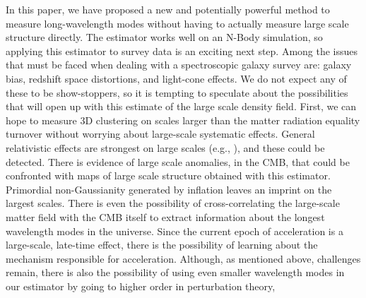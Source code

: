 \documentclass[prd,amsmath,amssymb,floatfix,superscriptaddress,nofootinbib,twocolumn]{revtex4-1}
\begin{document}
\label{sec4}
In this paper, we have proposed a new and potentially powerful method to measure long-wavelength modes without having to actually measure large scale structure directly. The estimator works well on an N-Body simulation, so applying this estimator to survey data is an exciting next step. Among the issues that must be faced when dealing with a spectroscopic galaxy survey are: galaxy bias, redshift space distortions, and light-cone effects. We do not expect any of these to be show-stoppers, so it is tempting to speculate about the possibilities that will open up with this estimate of the large scale density field. 
First, we can hope to measure 3D clustering on scales larger than the matter radiation equality turnover without worrying about large-scale systematic effects. General relativistic effects are strongest on large scales (e.g., \cite{Jeong:2012ls}), and these could be detected. There is evidence of large scale anomalies, in the CMB, that could be confronted with maps of large scale structure obtained with this estimator. Primordial non-Gaussianity generated by inflation leaves an imprint on the largest scales. There is even the possibility of cross-correlating the large-scale matter field with the CMB itself to extract information about the longest wavelength modes in the universe. Since the current epoch of acceleration is a large-scale, late-time effect, there is the possibility of learning about the mechanism responsible for acceleration. Although, as mentioned above, challenges remain, there is also the possibility of using even smaller wavelength modes in our estimator by going to higher order in perturbation theory,
\end{document}
